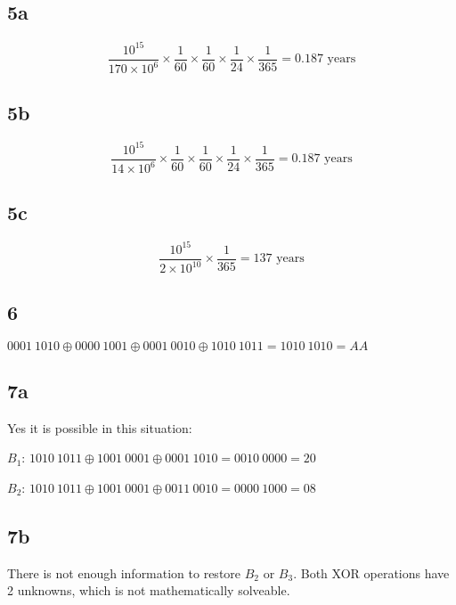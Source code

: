 \documentclass{article}
\begin{document}
\begin{multicols}{2}
    \subsection*{5a}
    \[
        \frac{10^{15}}{170\times10^6} \times \frac{1}{60}\times \frac{1}{60} \times \frac{1}{24} \times \frac{1}{365} = 0.187 \text{ years}
    \]
    \subsection*{5b}
    \[
        \frac{10^{15}}{14\times10^6} \times \frac{1}{60}\times \frac{1}{60} \times \frac{1}{24} \times \frac{1}{365} = 0.187 \text{ years}
    \]
    \subsection*{5c}
    \[
        \frac{10^{15}}{2\times 10^{10}} \times \frac{1}{365} = 137 \text{ years}
    \]
    \subsection*{6}
    $0001~1010 \oplus 0000~1001 \oplus 0001~0010 \oplus 1010~1011 = 1010~1010 = AA $
    \subsection*{7a}
    Yes it is possible in this situation:

    $B_1$:
    $1010~1011 \oplus 1001~0001 \oplus 0001~1010 = 0010~0000 = 20 $

    $B_2$:
    $1010~1011 \oplus 1001~0001 \oplus 0011~0010 = 0000~1000 = 08 $

    \subsection*{7b}
    There is not enough information to restore $B_2$ or $B_3$. Both XOR operations have 2 unknowns, which is not mathematically solveable.

\end{multicols}
\end{document}
